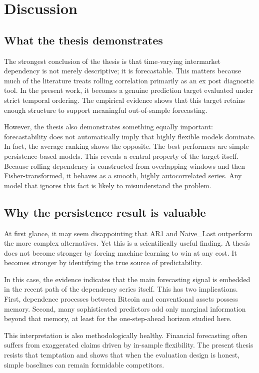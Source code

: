 ﻿\section{Discussion}

\subsection{What the thesis demonstrates}

The strongest conclusion of the thesis is that time-varying intermarket dependency is not merely descriptive; it is forecastable. This matters because much of the literature treats rolling correlation primarily as an ex post diagnostic tool. In the present work, it becomes a genuine prediction target evaluated under strict temporal ordering. The empirical evidence shows that this target retains enough structure to support meaningful out-of-sample forecasting.

However, the thesis also demonstrates something equally important: forecastability does not automatically imply that highly flexible models dominate. In fact, the average ranking shows the opposite. The best performers are simple persistence-based models. This reveals a central property of the target itself. Because rolling dependency is constructed from overlapping windows and then Fisher-transformed, it behaves as a smooth, highly autocorrelated series. Any model that ignores this fact is likely to misunderstand the problem.

\subsection{Why the persistence result is valuable}

At first glance, it may seem disappointing that AR1 and Naive\_Last outperform the more complex alternatives. Yet this is a scientifically useful finding. A thesis does not become stronger by forcing machine learning to win at any cost. It becomes stronger by identifying the true source of predictability.

In this case, the evidence indicates that the main forecasting signal is embedded in the recent path of the dependency series itself. This has two implications. First, dependence processes between Bitcoin and conventional assets possess memory. Second, many sophisticated predictors add only marginal information beyond that memory, at least for the one-step-ahead horizon studied here.

This interpretation is also methodologically healthy. Financial forecasting often suffers from exaggerated claims driven by in-sample flexibility. The present thesis resists that temptation and shows that when the evaluation design is honest, simple baselines can remain formidable competitors.


